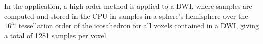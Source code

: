 \documentclass[twoside,twocolumn,10pt]{article}
\begin{document}
In the application, a high order method is applied to a DWI, where samples are computed and stored in the CPU in samples in a sphere's hemisphere over the $16^{th}$ tessellation order of the icosahedron for all voxels contained in a DWI, giving a total of 1281 samples per voxel.%








\end{document}
